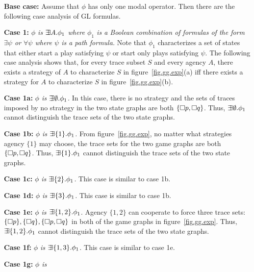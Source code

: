 \noindent 
{\bf Base case:} Assume that $\phi$ has only one modal operator.
Then there are the following case analysis of GL formulas.
\begin{list1}
\item {\bf Case 1:} {\em $\phi$ is $\mbox{$\exists\!\!\exists$}  A.\phi_1$
    where $\phi_1$ is a Boolean combination of
    formulas of the form $\exists \psi$ or $\forall \psi$
    where $\psi$ is a path formula.}
    Note that $\phi_1$ characterizes a set of states that 
    either start a play satisfying $\psi$ or 
    start only plays satisfying $\psi$.
    The following case analysis shows that, for every
    trace subset $S$ and every agency $A$,
    there exists a strategy of $A$ to characterize
    $S$ in figure~\ref{fig.gg.exp}(a) iff
    there exists a strategy for $A$ to characterize
    $S$ in figure~\ref{fig.gg.exp}(b).
    \begin{list2}
    \item {\bf Case 1a:} {\em $\phi$ is $\mbox{$\exists\!\!\exists$}\emptyset.\phi_1$.}
        In this case, there is no strategy and the sets of traces
        imposed by no strategy in the two state graphs are
        both $\{\Box p,\Box q\}$.
        Thus, $\mbox{$\exists\!\!\exists$}\emptyset.\phi_1$ cannot distinguish the trace sets of the
        two state graphs.
    \item {\bf Case 1b:} {\em $\phi$ is $\mbox{$\exists\!\!\exists$}\{1\}.\phi_1$.}
        From figure~\ref{fig.gg.exp}, no matter what strategies
        agency $\{1\}$ may choose, the
        trace sets for the two game graphs are both
        $\{\Box p,\Box q\}$.
        Thus, $\mbox{$\exists\!\!\exists$}\{1\}.\phi_1$ cannot distinguish the trace sets of the
        two state graphs.
    \item {\bf Case 1c:} {\em $\phi$ is
        $\mbox{$\exists\!\!\exists$}\{2\}.\phi_1$.}
        This case is similar to case 1b.
    \item {\bf Case 1d:} {\em $\phi$ is
        $\mbox{$\exists\!\!\exists$}\{3\}.\phi_1$.}
        This case is similar to case 1b.
    \item {\bf Case 1e:} {\em $\phi$ is
        $\mbox{$\exists\!\!\exists$}\{1,2\}.\phi_1$.}
        Agency $\{1, 2\}$ can cooperate to force three trace sets:
        $\{\Box p\}, \{\Box q\}, \{\Box p,\Box q\}$
        in both of the game graphs in figure~\ref{fig.gg.exp}.
        Thus, $\mbox{$\exists\!\!\exists$}\{1,2\}.\phi_1$ cannot distinguish the trace sets of the
        two state graphs.
    \item {\bf Case 1f:} {\em $\phi$ is
        $\mbox{$\exists\!\!\exists$}\{1,3\}.\phi_1$.}
        This case is similar to case 1e.
    \item {\bf Case 1g:} {\em $\phi$ is
}
\end{list2}
\end{list1}
